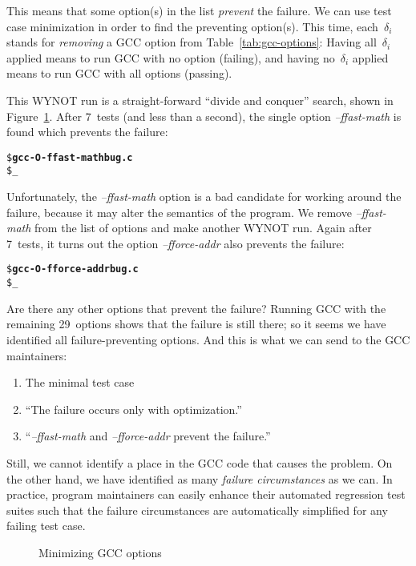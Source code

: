 \documentclass{acm_proc_article-sp}
\makeatletter
\newcommand{\GCC}        {{\small GCC}\xspace}
\newcommand{\WYNOT}      {{\small WYNOT}\xspace}
\def\*{\penalty\@M\discretionary{-}{}{\kern.03em}}
\theoremstyle{plain}
\makeatother
\begin{document}
\noindent
This means that some option(s) in the list \emph{prevent} the failure.
We can use test case minimization in order to find the preventing
option(s).  This time, each~$\delta_i$ stands for \emph{removing} a \GCC
option from Table~\ref{tab:gcc-options}: Having all~$\delta_i$ applied
means to run \GCC with no option (failing), and having no~$\delta_i$
applied means to run \GCC with all options (passing).

This \WYNOT run is a straight-forward ``divide and conquer'' search,
shown in Figure~\ref{fig:gccopts-log}.  After 7~tests (and less than
a second), the single option \textit{--f\*fast-math} is found which
prevents the failure:

\begin{alltt}\small\ttfamily
   \$ \textbf{gcc -O -ffast-math bug.c}
   \$ _
\end{alltt}

\noindent
Unfortunately, the \textit{--f\*fast-math} option is a bad candidate
for working around the failure, because it may alter the semantics of
the program.  We remove \textit{--f\*fast-math} from the list of
options and make another \WYNOT run.  Again after 7~tests,
it turns out the option \textit{--f\*force-addr} also prevents the
failure:

\begin{alltt}\small\ttfamily
   \$ \textbf{gcc -O -fforce-addr bug.c}
   \$ _
\end{alltt}

\noindent
Are there any other options that prevent the failure?  Running \GCC
with the remaining 29~options shows that the failure is still there;
so it seems we have identified all failure-preventing options.  And
this is what we can send to the \GCC maintainers: 
\begin{enumerate}
\item The minimal test case
\item ``The failure occurs only with optimization.''
\item ``\textit{--f\*fast-math} and \textit{--f\*force-addr} prevent 
  the failure.''
\end{enumerate}
Still, we cannot identify a place in the \GCC code that causes the
problem.  On the other hand, we have identified as many \emph{failure
  circumstances} as we can.  In practice, program maintainers can
easily enhance their automated regression test suites such that the
failure circumstances are automatically simplified for any failing
test case.

\begin{figure}[t]
\vspace{-1.5cm}
\vspace{-0.5cm}
\caption{Minimizing \GCC options}
\label{fig:gccopts-log}
\end{figure}
\end{document}
